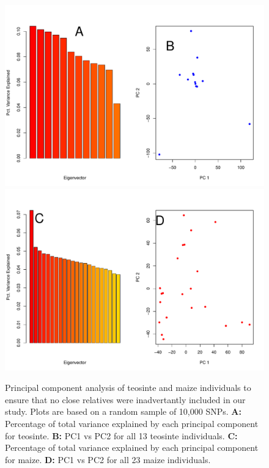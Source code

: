\begin{figure}
  \includegraphics[width=.5\textwidth]{FigsAndFiles/tilPCA_july.pdf}\\
    \includegraphics[width=.5\textwidth]{FigsAndFiles/bknPCA_july}\\
\caption{Principal component analysis of teosinte and maize individuals to ensure that no close relatives were inadvertantly included in our study. Plots are based on a random sample of 10,000 SNPs. {\bf A:} Percentage of total variance explained by each principal component for teosinte. {\bf B:} PC1 vs PC2 for all 13 teosinte individuals. {\bf C:} Percentage of total variance explained by each principal component for maize. {\bf D:} PC1 vs PC2 for all 23 maize individuals. }
\end{figure}
\clearpage

